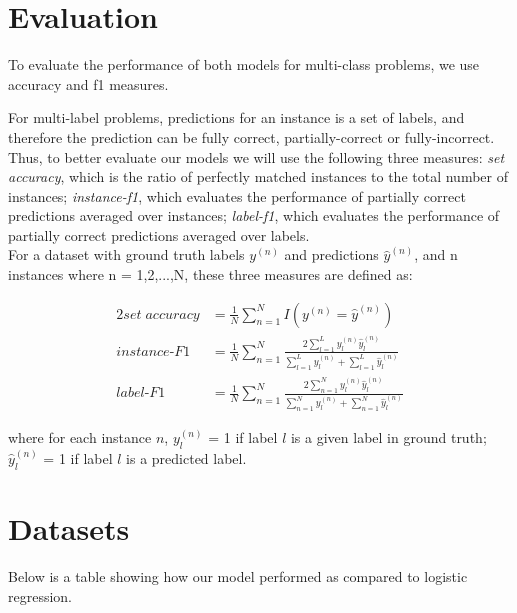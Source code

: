 \section{Evaluation}

To evaluate the performance of both models for multi-class problems, we use accuracy and f1 measures.

For multi-label problems, predictions for an instance is a set of labels, and therefore the prediction can be fully correct, partially-correct or fully-incorrect. Thus, to better evaluate our models we will use the following three measures: \textit{set accuracy}, which is the ratio of perfectly matched instances to the total number of instances; \textit{instance-f1}, which evaluates the performance of partially correct predictions averaged over instances; \textit{label-f1}, which evaluates the performance of partially correct predictions averaged over labels.\\

For a dataset with ground truth labels $y^{(n)}$ and predictions $\hat{y}^{(n)}$, and n instances where n = 1,2,...,N, these three measures are defined as:

\begin{alignat}{2}
set\; accuracy & = \frac{1}{N} \sum_{n=1}^{N} {I(y^{(n)} = \hat{y}^{(n)})}\\
instance \mbox{-} F1 & = \frac{1}{N} \sum_{n=1}^{N} \frac{2\sum_{l=1}^{L} {y^{(n)}_{l} \hat{y}^{(n)}_{l}}}{\sum_{l=1}^{L} {y^{(n)}_{l}} + \sum_{l=1}^{L} {\hat{y}^{(n)}_{l}}}\\
label \mbox{-} F1 & = \frac{1}{N} \sum_{n=1}^{N} \frac{2\sum_{n=1}^{N} {y^{(n)}_{l} \hat{y}^{(n)}_{l}}}{\sum_{n=1}^{N} {y^{(n)}_{l}} + \sum_{n=1}^{N} {\hat{y}^{(n)}_{l}}}
\end{alignat}

\noindent where for each instance $n$, $y^{(n)}_{l}$ = 1 if label $l$ is a given label in ground truth; \\
$\hat{y}^{(n)}_{l}$ = 1 if label $l$ is a predicted label.

\section{Datasets}

Below is a table showing how our model performed as compared to logistic regression. 

